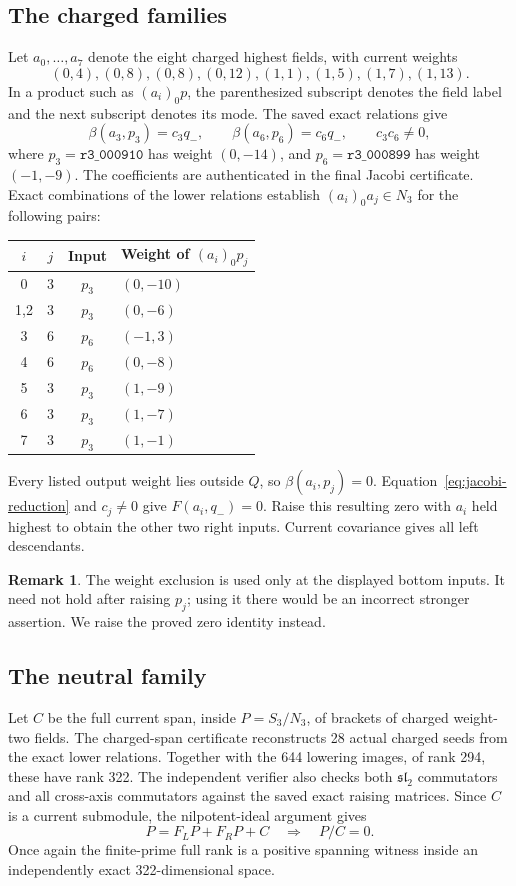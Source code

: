 \documentclass[11pt,a4paper]{article}
\theoremstyle{definition}
\newtheorem{remark}[theorem]{Remark}
\begin{document}
\subsection{The charged families}
Let \(a_0,\ldots,a_7\) denote the eight charged highest fields, with
current weights
\[
 (0,4),(0,8),(0,8),(0,12),(1,1),(1,5),(1,7),(1,13).
\]
In a product such as \((a_i)_0p\), the parenthesized subscript denotes
the field label and the next subscript denotes its mode.
The saved exact relations give
\[
 \beta(a_3,p_3)=c_3q_-,\qquad \beta(a_6,p_6)=c_6q_-,
 \qquad c_3c_6\neq0,
\]
where \(p_3=\texttt{r3\_000910}\) has weight \((0,-14)\), and
\(p_6=\texttt{r3\_000899}\) has weight \((-1,-9)\).
The coefficients are authenticated in the final Jacobi certificate.
Exact combinations of the lower relations establish \((a_i)_0a_j\in N_3\)
for the following pairs:
\begin{center}
\begin{tabular}{@{}cccl@{}}
\toprule
\(i\)&\(j\)&Input&Weight of \((a_i)_0p_j\)\\
\midrule
0&3&\(p_3\)&\((0,-10)\)\\
1,2&3&\(p_3\)&\((0,-6)\)\\
3&6&\(p_6\)&\((-1,3)\)\\
4&6&\(p_6\)&\((0,-8)\)\\
5&3&\(p_3\)&\((1,-9)\)\\
6&3&\(p_3\)&\((1,-7)\)\\
7&3&\(p_3\)&\((1,-1)\)\\
\bottomrule
\end{tabular}
\end{center}
Every listed output weight lies outside \(Q\), so
\(\beta(a_i,p_j)=0\). Equation~\eqref{eq:jacobi-reduction} and
\(c_j\neq0\) give \(F(a_i,q_-)=0\). Raise this resulting zero
with \(a_i\) held highest to obtain the other two right inputs.
Current covariance gives all left descendants.

\begin{remark}
The weight exclusion is used only at the displayed bottom inputs.
It need not hold after raising \(p_j\); using it there would be an
incorrect stronger assertion. We raise the proved zero identity instead.
\end{remark}

\subsection{The neutral family}
Let \(C\) be the full current span, inside \(P=S_3/N_3\), of
brackets of charged weight-two fields. The charged-span certificate
reconstructs 28 actual charged seeds from the exact lower relations.
Together with the 644 lowering images, of rank 294, these have rank 322.
The independent verifier also checks both \(\mathfrak{sl}_2\) commutators
and all cross-axis commutators against the saved exact raising matrices.
Since \(C\) is a current submodule, the nilpotent-ideal argument gives
\[
 P=F_LP+F_RP+C\quad\Longrightarrow\quad P/C=0.
\]
Once again the finite-prime full rank is a positive spanning witness
inside an independently exact 322-dimensional space.
\end{document}

